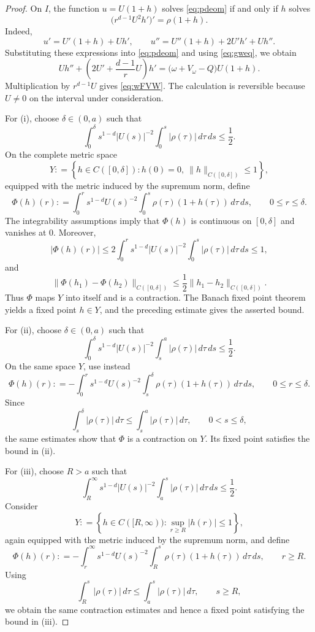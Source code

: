\documentclass[12pt, a4paper, reqno]{amsart}
\numberwithin{equation}{section}
\theoremstyle{definition}
\theoremstyle{remark}
\newcommand{\ce}{\mathrel{\mathop:}=}
\begin{document}
\begin{proof}
On $I$, the function
$u=U(1+h)$ solves \eqref{eq:pdeom} if and only if $h$ solves
\begin{equation}\label{eq:wFVW}
  \bigl(r^{d-1}U^2h'\bigr)'=\rho(1+h).
\end{equation}
Indeed,
\[
  u'=U'(1+h)+Uh',
  \qquad
  u''=U''(1+h)+2U'h'+Uh''.
\]
Substituting these expressions into \eqref{eq:pdeom} and using
\eqref{eq:gweq}, we obtain
\[
  Uh''+\left(2U'+\frac{d-1}{r}U\right)h'
  =\bigl(\omega+V_\omega-Q\bigr)U(1+h).
\]
Multiplication by $r^{d-1}U$ gives \eqref{eq:wFVW}.
The calculation is reversible because $U\ne0$ on the interval
under consideration.

For \textup{(i)}, choose $\delta\in(0,a)$ such that
\[
  \int_0^\delta s^{1-d}|U(s)|^{-2}
    \int_0^s|\rho(\tau)|\,d\tau\,ds
  \le\frac12.
\]
On the complete metric space
\[
  Y\ce \left\{
    h\in C([0,\delta]):
    h(0)=0,\ \|h\|_{C([0,\delta])}\le1
  \right\},
\]
equipped with the metric induced by the supremum norm, define
\[
  \Phi(h)(r)
  \ce
  \int_0^r s^{1-d}U(s)^{-2}
    \int_0^s\rho(\tau)(1+h(\tau))\,d\tau\,ds,
  \qquad 0\le r\le\delta.
\]
The integrability assumptions imply that $\Phi(h)$ is continuous
on $[0,\delta]$ and vanishes at $0$. Moreover,
\[
  |\Phi(h)(r)|
  \le
  2\int_0^r s^{1-d}|U(s)|^{-2}
    \int_0^s|\rho(\tau)|\,d\tau\,ds
  \le1,
\]
and
\[
  \|\Phi(h_1)-\Phi(h_2)\|_{C([0,\delta])}
  \le\frac12\|h_1-h_2\|_{C([0,\delta])}.
\]
Thus $\Phi$ maps $Y$ into itself and is a contraction.
The Banach fixed point theorem yields a fixed point $h\in Y$,
and the preceding estimate gives the asserted bound.

For \textup{(ii)}, choose $\delta\in(0,a)$ such that
\[
  \int_0^\delta s^{1-d}|U(s)|^{-2}
    \int_s^a|\rho(\tau)|\,d\tau\,ds
  \le\frac12.
\]
On the same space $Y$, use instead
\[
  \Phi(h)(r)
  \ce
  -\int_0^r s^{1-d}U(s)^{-2}
    \int_s^\delta\rho(\tau)(1+h(\tau))\,d\tau\,ds,
  \qquad 0\le r\le\delta.
\]
Since
\[
  \int_s^\delta|\rho(\tau)|\,d\tau
  \le\int_s^a|\rho(\tau)|\,d\tau,
  \qquad 0<s\le\delta,
\]
the same estimates show that $\Phi$ is a contraction on $Y$.
Its fixed point satisfies the bound in \textup{(ii)}.

For \textup{(iii)}, choose $R>a$ such that
\[
  \int_R^\infty s^{1-d}|U(s)|^{-2}
    \int_a^s|\rho(\tau)|\,d\tau\,ds
  \le\frac12.
\]
Consider
\[
  Y\ce \left\{
    h\in C([R,\infty)):
    \sup_{r\ge R}|h(r)|\le1
  \right\},
\]
again equipped with the metric induced by the supremum norm, and define
\[
  \Phi(h)(r)
  \ce
  -\int_r^\infty s^{1-d}U(s)^{-2}
    \int_R^s\rho(\tau)(1+h(\tau))\,d\tau\,ds,
  \qquad r\ge R.
\]
Using
\[
  \int_R^s|\rho(\tau)|\,d\tau
  \le\int_a^s|\rho(\tau)|\,d\tau,
  \qquad s\ge R,
\]
we obtain the same contraction estimates and hence a fixed point
satisfying the bound in \textup{(iii)}.


\end{proof}
\end{document}
